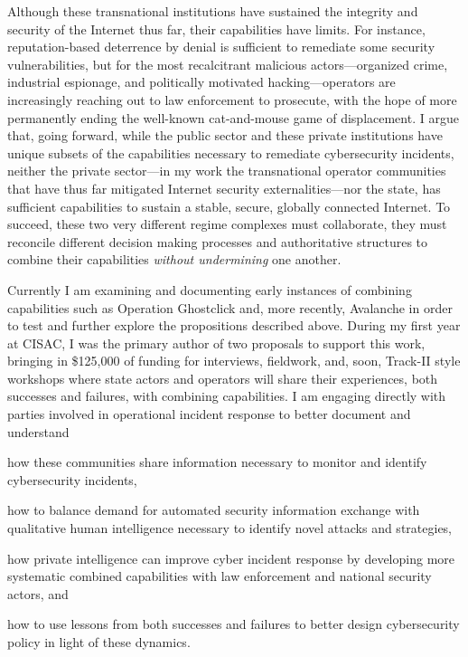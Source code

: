 \documentclass{letter}[12pt]
\begin{document}
\begin{letter}
Although these transnational institutions have sustained the integrity
and security of the Internet thus far, their capabilities have limits.
For instance, reputation-based deterrence by denial is sufficient to
remediate some security vulnerabilities, but for the most recalcitrant
malicious actors---organized crime, industrial espionage, and
politically motivated hacking---operators are increasingly reaching out to law enforcement to prosecute, with the hope of more permanently ending the well-known cat-and-mouse game of displacement.  I argue that, going forward, while the public sector and these private institutions have unique subsets of the capabilities necessary to remediate cybersecurity incidents, neither the private sector---in my work the transnational operator communities that have thus far mitigated Internet security externalities---nor the state, has sufficient capabilities to sustain a stable, secure, globally connected Internet.  To succeed, these two very different regime complexes must collaborate, they must reconcile different decision making processes and authoritative structures to combine their capabilities \emph{without undermining} one another.  

Currently I am examining and documenting early instances of combining
capabilities such as Operation Ghostclick and, more recently,
Avalanche in order to test and further explore the propositions
described above.  During my first year at CISAC, I was the primary
author of two proposals to support this work, bringing in \$125,000 of
funding for interviews, fieldwork, and, soon, Track-II style workshops
where state actors and operators will share their experiences, both
successes and failures, with combining capabilities.  I am engaging
directly with parties involved in operational incident response to
better document and understand 
\begin{inparaenum}[(1)]
  \item how these communities share information necessary to monitor
    and identify cybersecurity incidents, 
  \item how to balance demand for automated security information
    exchange with qualitative human intelligence necessary to identify
    novel attacks and strategies,
  \item how private intelligence can improve cyber incident response
    by developing more systematic combined capabilities with law
    enforcement and national security actors, and 
  \item how to use lessons from both successes and failures to better
    design cybersecurity policy in light of these dynamics.   
\end{inparaenum}


\end{letter}
\end{document}
